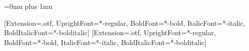 \IEEEoverridecommandlockouts
\usepackage{cite}
\usepackage{amsmath,amssymb}
\usepackage{graphicx}
\usepackage{booktabs}
\usepackage{array}
\usepackage{url}
\Urlmuskip=0mu plus 1mu
\expandafter\def\expandafter\UrlBreaks\expandafter{\UrlBreaks\do0\do1\do2\do3\do4\do5\do6\do7\do8\do9}
\usepackage{placeins}
\ifXeTeX
  \usepackage{newtxmath}
  \usepackage{fontspec}
  \setmainfont{texgyretermes}[Extension=.otf, UprightFont=*-regular, BoldFont=*-bold,
    ItalicFont=*-italic, BoldItalicFont=*-bolditalic]
  \setmonofont{texgyrecursor}[Extension=.otf, UprightFont=*-regular, BoldFont=*-bold,
    ItalicFont=*-italic, BoldItalicFont=*-bolditalic]
\else
  \usepackage[T1]{fontenc}
  \usepackage{newtxtext,newtxmath}
\fi
\usepackage{textcomp}


